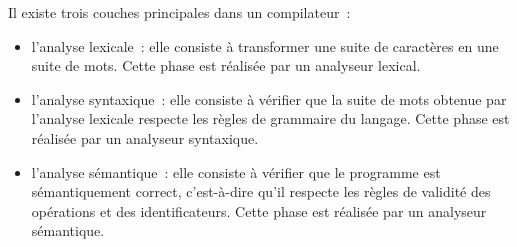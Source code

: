 Il existe trois couches principales dans un compilateur~: 
\begin{itemize}
  \item l'analyse lexicale~: elle consiste à transformer une suite de caractères en une suite de mots. Cette phase est réalisée par un analyseur lexical.
  \item l'analyse syntaxique~: elle consiste à vérifier que la suite de mots obtenue par l'analyse lexicale respecte les règles de grammaire du langage. Cette phase est réalisée par un analyseur syntaxique.
  \item l'analyse sémantique~: elle consiste à vérifier que le programme est sémantiquement correct, c'est-à-dire qu'il respecte les règles de validité des opérations et des identificateurs. Cette phase est réalisée par un analyseur sémantique.
\end{itemize}
